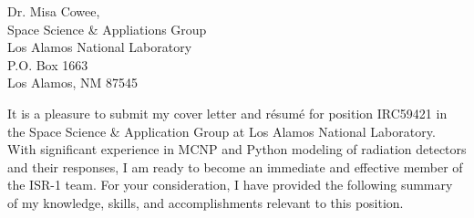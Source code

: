 
\begin{center}
\begin{minipage}{\textwidth}

  \normalsize

  \vspace{4mm} 


  Dr. Misa Cowee, \\

  Space Science \& Appliations Group \\
  Los Alamos National Laboratory \\
  P.O. Box 1663 \\
  Los Alamos, NM 87545 \\
  
  \vspace{2mm} 

  It is a pleasure to submit my cover letter and r\'{e}sum\'{e} for position IRC59421 in the Space Science \& Application Group at Los Alamos National Laboratory.
  With significant experience in \textsc{MCNP} and Python modeling of radiation detectors and their responses, I am ready to become an immediate and effective member of the ISR-1 team.
  For your consideration, I have provided the following summary of my knowledge, skills, and accomplishments relevant to this position. \\

  



\end{minipage}
\end{center}
